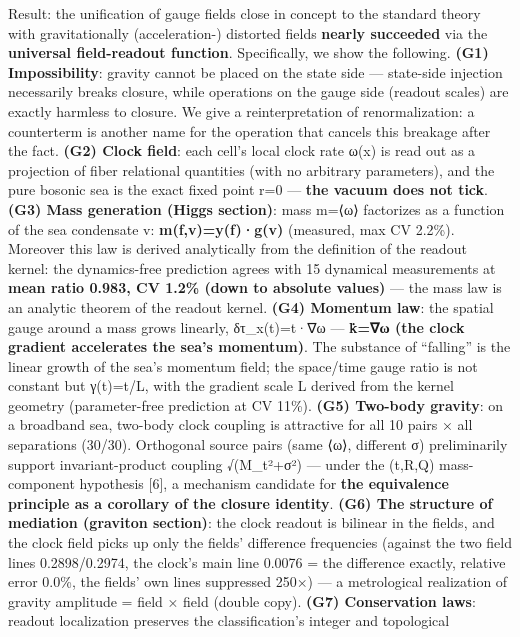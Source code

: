 \documentclass[
]{article}
\begin{document}
Result: the unification of gauge fields close in concept to the standard
theory with gravitationally (acceleration-) distorted fields
\textbf{nearly succeeded} via the \textbf{universal field-readout
function}. Specifically, we show the following. \textbf{(G1)
Impossibility}: gravity cannot be placed on the state side ---
state-side injection necessarily breaks closure, while operations on the
gauge side (readout scales) are exactly harmless to closure. We give a
reinterpretation of renormalization: a counterterm is another name for
the operation that cancels this breakage after the fact. \textbf{(G2)
Clock field}: each cell's local clock rate ω(x) is read out as a
projection of fiber relational quantities (with no arbitrary
parameters), and the pure bosonic sea is the exact fixed point r=0 ---
\textbf{the vacuum does not tick}. \textbf{(G3) Mass generation (Higgs
section)}: mass m=⟨ω⟩ factorizes as a function of the sea condensate v:
\textbf{m(f,v)=y(f)·g(v)} (measured, max CV 2.2\%). Moreover this law is
derived analytically from the definition of the readout kernel: the
dynamics-free prediction agrees with 15 dynamical measurements at
\textbf{mean ratio 0.983, CV 1.2\% (down to absolute values)} --- the
mass law is an analytic theorem of the readout kernel. \textbf{(G4)
Momentum law}: the spatial gauge around a mass grows linearly,
δτ\_x(t)=t·∇ω --- \textbf{k̇=∇ω (the clock gradient accelerates the sea's
momentum)}. The substance of ``falling'' is the linear growth of the
sea's momentum field; the space/time gauge ratio is not constant but
γ(t)=t/L, with the gradient scale L derived from the kernel geometry
(parameter-free prediction at CV 11\%). \textbf{(G5) Two-body gravity}:
on a broadband sea, two-body clock coupling is attractive for all 10
pairs × all separations (30/30). Orthogonal source pairs (same ⟨ω⟩,
different σ) preliminarily support invariant-product coupling
√(M\_t²+σ²) --- under the (t,R,Q) mass-component hypothesis {[}6{]}, a
mechanism candidate for \textbf{the equivalence principle as a corollary
of the closure identity}. \textbf{(G6) The structure of mediation
(graviton section)}: the clock readout is bilinear in the fields, and
the clock field picks up only the fields' difference frequencies
(against the two field lines 0.2898/0.2974, the clock's main line 0.0076
= the difference exactly, relative error 0.0\%, the fields' own lines
suppressed 250×) --- a metrological realization of gravity amplitude =
field × field (double copy). \textbf{(G7) Conservation laws}: readout
localization preserves the classification's integer and topological
\end{document}
